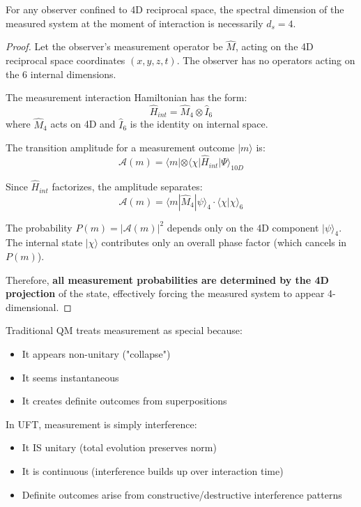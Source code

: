 \begin{theorem}
For any observer confined to 4D reciprocal space, the spectral dimension of the measured system at the moment of interaction is necessarily $d_s = 4$.
\end{theorem}

\begin{proof}
Let the observer's measurement operator be $\hat{M}$, acting on the 4D reciprocal space coordinates $(x, y, z, t)$. The observer has no operators acting on the 6 internal dimensions.

The measurement interaction Hamiltonian has the form:
\begin{equation}
    \hat{H}_{int} = \hat{M}_4 \otimes \hat{I}_6
\end{equation}
where $\hat{M}_4$ acts on 4D and $\hat{I}_6$ is the identity on internal space.

The transition amplitude for a measurement outcome $|m\rangle$ is:
\begin{equation}
    \mathcal{A}(m) = \langle m| \otimes \langle\chi| \hat{H}_{int} |\Psi\rangle_{10D}
\end{equation}

Since $\hat{H}_{int}$ factorizes, the amplitude separates:
\begin{equation}
    \mathcal{A}(m) = \langle m|\hat{M}_4|\psi\rangle_4 \cdot \langle\chi|\chi\rangle_6
\end{equation}

The probability $P(m) = |\mathcal{A}(m)|^2$ depends only on the 4D component $|\psi\rangle_4$. The internal state $|\chi\rangle$ contributes only an overall phase factor (which cancels in $P(m)$).

Therefore, \textbf{all measurement probabilities are determined by the 4D projection} of the state, effectively forcing the measured system to appear 4-dimensional.
\end{proof}

\begin{insight}
Traditional QM treats measurement as special because:
\begin{itemize}
    \item It appears non-unitary ("collapse")
    \item It seems instantaneous
    \item It creates definite outcomes from superpositions
\end{itemize}

In UFT, measurement is simply interference:
\begin{itemize}
    \item It IS unitary (total evolution preserves norm)
    \item It is continuous (interference builds up over interaction time)
    \item Definite outcomes arise from constructive/destructive interference patterns
\end{itemize}
\end{insight}

